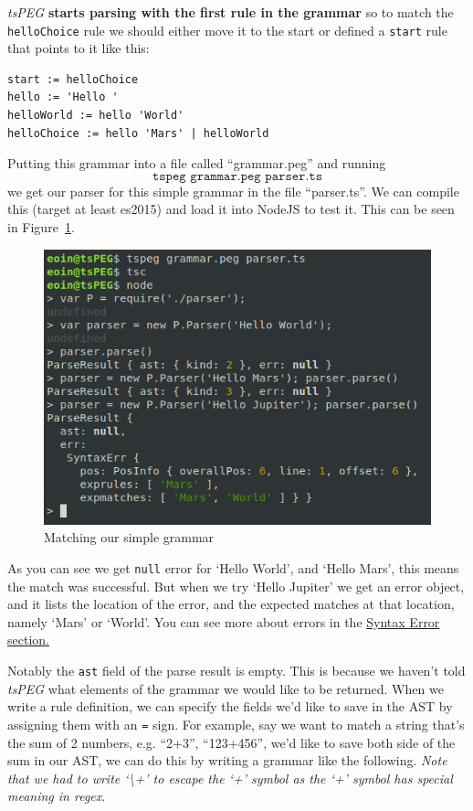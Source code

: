 \emph{tsPEG} \textbf{starts parsing with the first rule in the grammar}
so to match the \texttt{helloChoice} rule we should either move it to
the start or defined a \texttt{start} rule that points to it like this:

\begin{verbatim}
start := helloChoice
hello := 'Hello '
helloWorld := hello 'World'
helloChoice := hello 'Mars' | helloWorld
\end{verbatim}

Putting this grammar into a file called ``grammar.peg'' and running
\[\texttt{tspeg\ grammar.peg\ parser.ts}\]
we get our parser for this simple
grammar in the file ``parser.ts''. We can compile this (target at least
es2015) and load it into NodeJS to test it. This can be seen in Figure~\ref{basictspegexample}.

\begin{figure}[ht]
\caption{Matching our simple grammar}
\label{basictspegexample}
\centering
\includegraphics[scale=0.7]{src/app1assets/example1.png}
\end{figure}

As you can see we get \texttt{null} error for `Hello World', and `Hello
Mars', this means the match was successful. But when we try `Hello
Jupiter' we get an error object, and it lists the location of the error,
and the expected matches at that location, namely `Mars' or `World'. You
can see more about errors in the
\protect\hyperlink{syntax-errors}{Syntax Error section.}

Notably the \texttt{ast} field of the parse result is empty. This is
because we haven't told \emph{tsPEG} what elements of the grammar we
would like to be returned. When we write a rule definition, we can
specify the fields we'd like to save in the AST by assigning them with
an \texttt{=} sign. For example, say we want to match a string that's
the sum of 2 numbers, e.g. ``2+3'', ``123+456'', we'd like to save both
side of the sum in our AST, we can do this by writing a grammar like the
following. \emph{Note that we had to write `\textbackslash{}+' to escape
the `+' symbol as the `+' symbol has special meaning in regex}.

